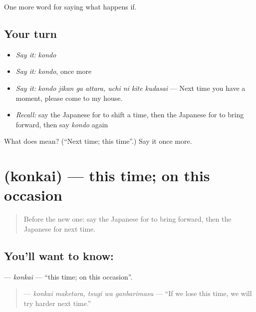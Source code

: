 \begin{grammarlens}[title={What you've built}]
One more word for saying what happens if.
\end{grammarlens}

\subsection*{Your turn}
\begin{itemize}
\raggedright
  \item \emph{Say it:} \emph{kondo}
  \item \emph{Say it:} \emph{kondo}, once more
  \item \emph{Say it:} \emph{kondo jikan ga attara, uchi ni kite kudasai} — Next time you have a moment, please come to my house.
  \item \emph{Recall:} say the Japanese for to shift a time, then the Japanese for to bring forward, then say \emph{kondo} again
\end{itemize}

\begin{tcolorbox}[breakable,colback=teal!4,colframe=teal!35!black,title={Before you move on}]
What does  mean? (\textquotedblleft{}Next time; this time\textquotedblright{}.) Say it once more.
\end{tcolorbox}
\section[\texorpdfstring{\ja{こんかい} (konkai)}{こんかい (konkai)}]{ (konkai) — this time; on this occasion}

\label{lesson:JA-C346-konkai}



\begin{quote}
Before the new one: say the Japanese for to bring forward, then the Japanese for next time.
\end{quote}

\subsection*{You'll want to know: }
\textbf{} — \emph{konkai} — \textquotedblleft{}this time; on this occasion\textquotedblright{}.

\begin{quote}
\textbf{  } — \emph{konkai maketara, tsugi wa ganbarimasu} — \textquotedblleft{}If we lose this time, we will try harder next time.\textquotedblright{}
\end{quote}

